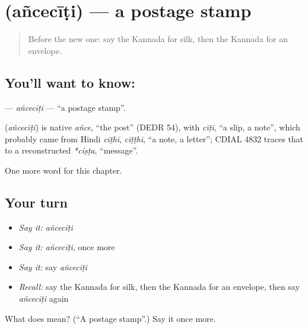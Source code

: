\section[\texorpdfstring{\kn{ಅಂಚೆಚೀಟಿ} (añcecīṭi)}{ಅಂಚೆಚೀಟಿ (añcecīṭi)}]{ (añcecīṭi) — a postage stamp}

\label{lesson:KA-C295-anceciti}



\begin{quote}
Before the new one: say the Kannada for silk, then the Kannada for an envelope.
\end{quote}

\subsection*{You'll want to know: }
\textbf{} — \emph{añcecīṭi} — \textquotedblleft{}a postage stamp\textquotedblright{}.

\begin{cousinweb}
\textbf{} (\emph{añcecīṭi}) is native \emph{añce}, \textquotedblleft{}the post\textquotedblright{} (DEDR 54), with \emph{cīṭi}, \textquotedblleft{}a slip, a note\textquotedblright{}, which probably came from Hindi \emph{cīṭhī}, \emph{ciṭṭhī}, \textquotedblleft{}a note, a letter\textquotedblright{}; CDIAL 4832 traces that to a reconstructed \emph{*ciṣṭa}, \textquotedblleft{}message\textquotedblright{}.
\end{cousinweb}

\begin{grammarlens}[title={What you've built}]
One more word for this chapter.
\end{grammarlens}

\subsection*{Your turn}
\begin{itemize}
\raggedright
  \item \emph{Say it:} \emph{añcecīṭi}
  \item \emph{Say it:} \emph{añcecīṭi}, once more
  \item \emph{Say it:} say \emph{añcecīṭi}
  \item \emph{Recall:} say the Kannada for silk, then the Kannada for an envelope, then say \emph{añcecīṭi} again
\end{itemize}

\begin{tcolorbox}[breakable,colback=teal!4,colframe=teal!35!black,title={Before you move on}]
What does  mean? (\textquotedblleft{}A postage stamp\textquotedblright{}.) Say it once more.
\end{tcolorbox}

